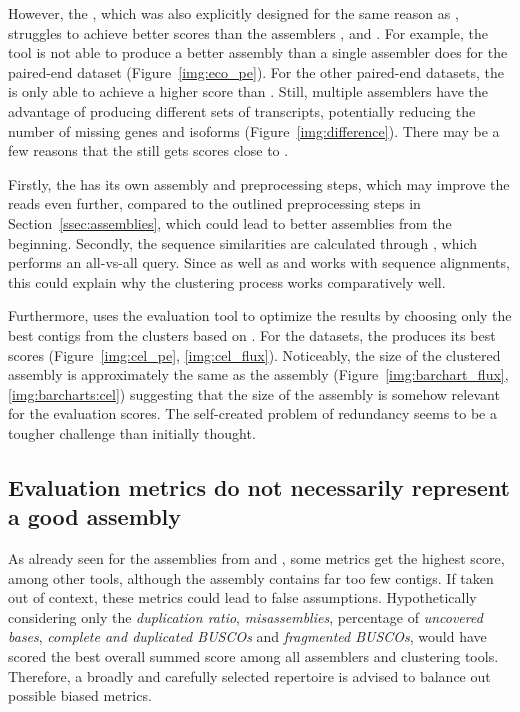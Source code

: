\documentclass[12pt,a4paper,english]{article}
\begin{document}
	However, the \orp, which was also explicitly designed for the same reason as \karma,  struggles to achieve better scores than the assemblers \soap, \spades and \trinity. 
	For example, the tool is not able to produce a better assembly than a single assembler does for the paired-end \ecoli dataset (Figure~\ref{img:eco_pe}). For the other paired-end \celegans datasets, the \orp is only able to achieve a higher score than \soap. 
	Still, multiple assemblers have the advantage of producing different sets of transcripts, potentially reducing the number of missing genes and isoforms (Figure~\ref{img:difference}).
	There may be a few reasons that the \orp still gets scores close to \cdhit. 
	
	
	Firstly, the \orp has its own assembly and preprocessing steps, which may improve the reads even further, compared to the outlined preprocessing steps in Section~\ref{ssec:assemblies}, which could lead to better assemblies from the beginning.
	Secondly, the sequence similarities are calculated through \orthofinder \citep{OrthoFinder:15}, which performs an all-vs-all \blast \citep{blast:90} query.
	Since \blast as well as \cdhit and \linclust works with sequence alignments, this could explain why the clustering process works comparatively well.
	
	Furthermore, \citeauthor{OysterRiverProtocol:18} uses the evaluation tool \transrate to optimize the results by choosing only the best contigs from the clusters based on \transrate \citep{OysterRiverProtocol:18}.
	For the \celegans datasets, the \orp produces its best scores (Figure~\ref{img:cel_pe}, \ref{img:cel_flux}). Noticeably, the size of the clustered assembly is approximately the same as the \cdhit assembly (Figure~\ref{img:barchart_flux}, \ref{img:barcharts:cel}) suggesting that the size of the assembly is somehow relevant for the evaluation scores.
	The self-created problem of redundancy seems to be a tougher challenge than initially thought.
	
	\subsection{Evaluation metrics do not necessarily represent a good assembly}
	    As already seen for the assemblies from \karma and \grouper, some metrics get the highest score, among other tools, although the assembly contains far too few contigs.
		If taken out of context, these metrics could lead to false assumptions. Hypothetically considering only the \textit{duplication ratio}, \textit{misassemblies}, percentage of \textit{uncovered bases}, \textit{complete and duplicated BUSCOs} and \textit{fragmented BUSCOs}, \grouper would have scored the best overall summed score among all assemblers and clustering tools.
		Therefore, a broadly and carefully selected repertoire is advised to balance out possible biased metrics.
	
\end{document}
